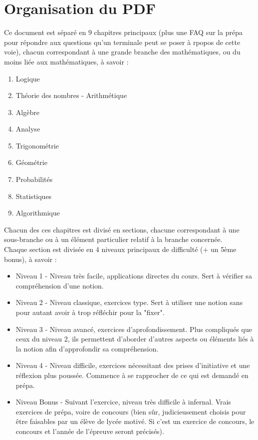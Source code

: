 \documentclass[a4paper]{report}
\begin{document}
	\section{Organisation du PDF}
		Ce document est séparé en 9 chapitres principaux (plus une FAQ sur la prépa pour répondre aux questions qu'un terminale peut se poser à rpopos de cette voie), chacun correspondant à une grande branche des mathématiques, ou du moins liée aux mathématiques, à savoir :
		\begin{enumerate}
			\item Logique
			\item Théorie des nombres - Arithmétique
			\item Algèbre
			\item Analyse
			\item Trigonométrie
			\item Géométrie
			\item Probabilités
			\item Statistiques
			\item Algorithmique
		\end{enumerate}
		Chacun des ces chapitres est divisé en sections, chacune correspondant à une sous-branche ou à un élément particulier relatif à la branche concernée.\\
		Chaque section est divisée en 4 niveaux principaux de difficulté (+ un 5ème bonus), à savoir :
		\begin{itemize}
			\item Niveau 1 - Niveau très facile, applications directes du cours. Sert à vérifier sa compréhension d'une notion.
			\item Niveau 2 - Niveau classique, exercices type. Sert à utiliser une notion sans pour autant avoir à trop réfléchir pour la "fixer".
			\item Niveau 3 - Niveau avancé, exercices d'aprofondissement. Plus compliqués que ceux du niveau 2, ils permettent d'aborder d'autres aspects ou éléments liés à la notion afin d'approfondir sa compréhension.
			\item Niveau 4 - Niveau difficile, exercices nécessitant des prises d'initiative et une réflexion plus poussée. Commence à se rapprocher de ce qui est demandé en prépa.
			\item Niveau Bonus - Suivant l'exercice, niveau très difficile à infernal. Vrais exercices de prépa, voire de concours (bien sûr, judicieusement choisis pour être faisables par un élève de lycée motivé. Si c'est un exercice de concours, le concours et l'année de l'épreuve seront précisés).
		\end{itemize}
\end{document}
